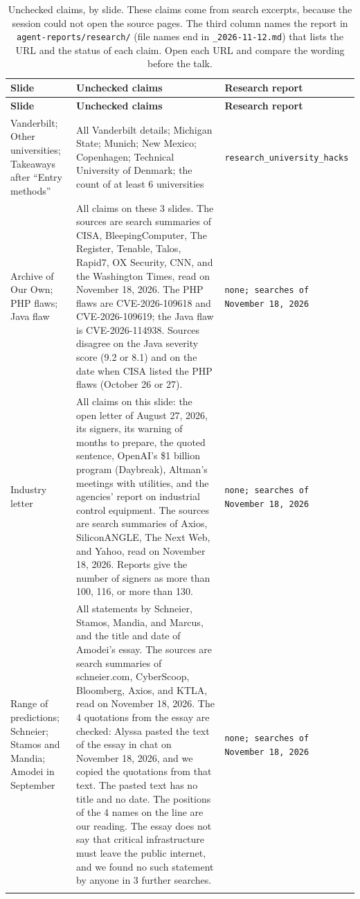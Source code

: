 \documentclass[10pt]{article}
\begin{document}
\begin{longtable}{L{0.22\textwidth}L{0.45\textwidth}L{0.25\textwidth}}
\caption{Unchecked claims, by slide. These claims come from search excerpts, because the session could not open the source pages. The third column names the report in \texttt{agent-reports/research/} (file names end in \texttt{\_2026-11-12.md}) that lists the URL and the status of each claim. Open each URL and compare the wording before the talk.}\\
\toprule
\textbf{Slide} & \textbf{Unchecked claims} & \textbf{Research report}\\
\midrule
\endfirsthead
\toprule
\textbf{Slide} & \textbf{Unchecked claims} & \textbf{Research report}\\
\midrule
\endhead
Vanderbilt; Other universities; Takeaways after ``Entry methods'' & All Vanderbilt details; Michigan State; Munich; New Mexico; Copenhagen; Technical University of Denmark; the count of at least 6 universities & \texttt{research\_\allowbreak university\_\allowbreak hacks}\\\addlinespace
Archive of Our Own; PHP flaws; Java flaw & All claims on these 3 slides. The sources are search summaries of CISA, BleepingComputer, The Register, Tenable, Talos, Rapid7, OX Security, CNN, and the Washington Times, read on November 18, 2026. The PHP flaws are CVE-2026-109618 and CVE-2026-109619; the Java flaw is CVE-2026-114938. Sources disagree on the Java severity score (9.2 or 8.1) and on the date when CISA listed the PHP flaws (October 26 or 27). & \texttt{none; searches of November 18, 2026}\\\addlinespace
Industry letter & All claims on this slide: the open letter of August 27, 2026, its signers, its warning of months to prepare, the quoted sentence, OpenAI's \$1 billion program (Daybreak), Altman's meetings with utilities, and the agencies' report on industrial control equipment. The sources are search summaries of Axios, SiliconANGLE, The Next Web, and Yahoo, read on November 18, 2026. Reports give the number of signers as more than 100, 116, or more than 130. & \texttt{none; searches of November 18, 2026}\\\addlinespace
Range of predictions; Schneier; Stamos and Mandia; Amodei in September & All statements by Schneier, Stamos, Mandia, and Marcus, and the title and date of Amodei's essay. The sources are search summaries of schneier.com, CyberScoop, Bloomberg, Axios, and KTLA, read on November 18, 2026. The 4 quotations from the essay are checked: Alyssa pasted the text of the essay in chat on November 18, 2026, and we copied the quotations from that text. The pasted text has no title and no date. The positions of the 4 names on the line are our reading. The essay does not say that critical infrastructure must leave the public internet, and we found no such statement by anyone in 3 further searches. & \texttt{none; searches of November 18, 2026}\\\addlinespace

\end{longtable}
\end{document}
